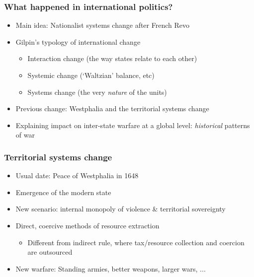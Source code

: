 \documentclass[utf8, xcolor=dvipsnames]{beamer}
\begin{document}
\begin{frame}
\frametitle{What happened in international politics?}
\centering

\begin{itemize}[<+->]
  \item Main idea: Nationalist systems change after French Revo
  \item Gilpin's typology of international change
  \begin{itemize}
    \item Interaction change (the way states relate to each other)
    \item Systemic change (`Waltzian' balance, etc)
    \item Systems change (the very \textit{nature} of the units)
  \end{itemize}
  \item Previous change: Westphalia and the territorial systems change
  \item Explaining impact on inter-state warfare at a global level: \textit{historical} patterns of war
 \end{itemize}

\end{frame}

\begin{frame}
\frametitle{Territorial systems change}
\centering

\begin{itemize}[<+->]
  \item Usual date: Peace of Westphalia in 1648
  \item Emergence of the modern state
  \item New scenario: internal monopoly of violence \& territorial sovereignty
  \item Direct, coercive methods of resource extraction
  \begin{itemize}
    \item Different from indirect rule, where tax/resource collection and coercion are outsourced
  \end{itemize}
  \item New warfare: Standing armies, better weapons, larger wars, ...
\end{itemize}

\end{frame}
\end{document}
